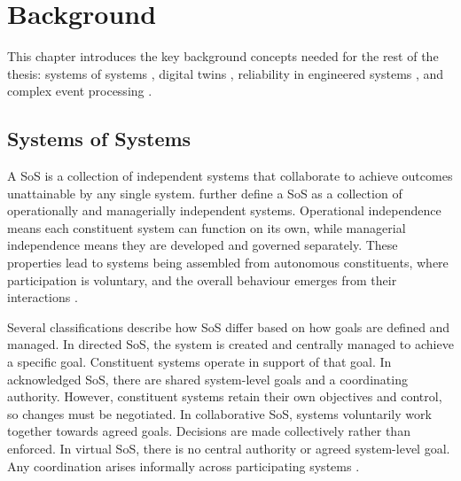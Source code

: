 \chapter{Background}\label{ch:background}
This chapter introduces the key background concepts needed for the rest of the thesis: systems of systems , digital twins , reliability in engineered systems , and complex event processing .

\section{Systems of Systems}\label{sec:background-sos}
A SoS is a collection of independent systems that collaborate to achieve outcomes unattainable by any single system. \citet{maier1998architecting} further define a SoS as a collection of operationally and managerially independent systems. Operational independence means each constituent system can function on its own, while managerial independence means they are developed and governed separately. These properties lead to systems being assembled from autonomous constituents, where participation is voluntary, and the overall behaviour emerges from their interactions \cite{boardman2006system}.

Several classifications describe how SoS differ based on how goals are defined and managed. In directed SoS, the system is created and centrally managed to achieve a specific goal. Constituent systems operate in support of that goal. In acknowledged SoS, there are shared system-level goals and a coordinating authority. However, constituent systems retain their own objectives and control, so changes must be negotiated. In collaborative SoS, systems voluntarily work together towards agreed goals. Decisions are made collectively rather than enforced. In virtual SoS, there is no central authority or agreed system-level goal. Any coordination arises informally across participating systems \cite{nielsen2015systems,dahmann2008systems}.

